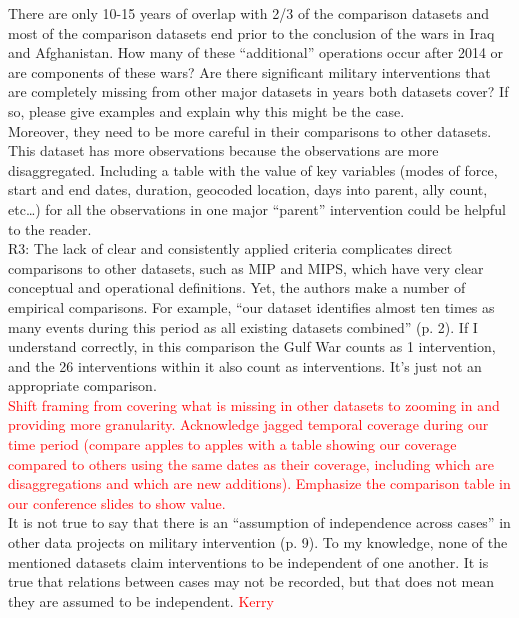 \documentclass[fleqn,12pt]{article}
\begin{document}
\noindent 
There are only 10-15 years of overlap with 2/3 of the comparison datasets and most of the comparison datasets end prior to the conclusion of the wars in Iraq and Afghanistan. How many of these “additional” operations occur after 2014 or are components of these wars? Are there significant military interventions that are completely missing from other major datasets in years both datasets cover? If so, please give examples and explain why this might be the case. \\

\noindent
Moreover, they need to be more careful in their comparisons to other datasets. This dataset has more observations because the observations are more disaggregated. Including a table with the value of key variables (modes of force, start and end dates, duration, geocoded location, days into parent, ally count, etc…) for all the observations in one major “parent” intervention could be helpful to the reader.  \\

\noindent
R3: The lack of clear and consistently applied criteria complicates direct comparisons to other datasets, such as MIP and MIPS, which have very clear conceptual and operational definitions. Yet, the authors make a number of empirical comparisons. For example, “our dataset identifies almost ten times as many events during this period as all existing datasets combined” (p. 2). If I understand correctly, in this comparison the Gulf War counts as 1 intervention, and the 26 interventions within it also count as interventions. It’s just not an appropriate comparison. \\

\textcolor{red}{Shift framing from covering what is missing in other datasets to zooming in and providing more granularity. Acknowledge jagged temporal coverage during our time period (compare apples to apples with a table showing our coverage compared to others using the same dates as their coverage, including which are disaggregations and which are new additions). Emphasize the comparison table in our conference slides to show value.} \\

\noindent 
It is not true to say that there is an “assumption of independence across cases” in other data projects on military intervention (p. 9). To my knowledge, none of the mentioned datasets claim interventions to be independent of one another. It is true that relations between cases may not be recorded, but that does not mean they are assumed to be independent. \textcolor{red}{Kerry} \\
\end{document}
